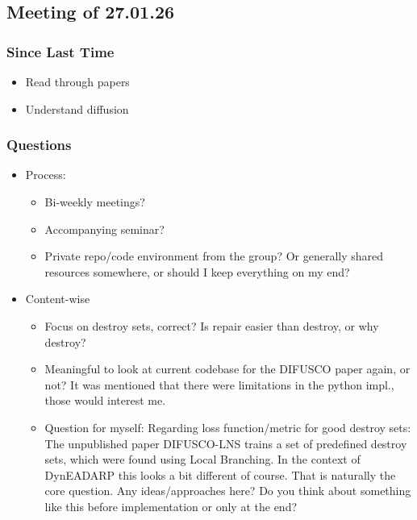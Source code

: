 \subsection{Meeting of 27.01.26}
\subsubsection{Since Last Time}
\begin{itemize}
    \item Read through papers
    \item Understand diffusion
\end{itemize}
\subsubsection{Questions}
\begin{itemize}
    \item Process:
    \begin{itemize}
        \item Bi-weekly meetings? 
        \item Accompanying seminar? 
        \item Private repo/code environment from the group? Or generally shared resources somewhere, or should I keep everything on my end? 
    \end{itemize}
    \item Content-wise
    \begin{itemize}
        \item Focus on destroy sets, correct? Is repair easier than destroy, or why destroy? 
        \item Meaningful to look at current codebase for the DIFUSCO paper again, or not? It was mentioned that there were limitations in the python impl., those would interest me. 
        \item Question for myself: Regarding loss function/metric for good destroy sets: The unpublished paper DIFUSCO-LNS trains a set of predefined destroy sets, which were found using Local Branching. In the context of DynEADARP this looks a bit different of course. That is naturally the core question. Any ideas/approaches here? Do you think about something like this before implementation or only at the end?
    \end{itemize}
\end{itemize}
